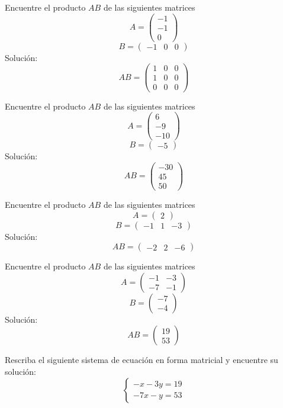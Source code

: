 \begin{exmp}
	Encuentre el producto $AB$ de las siguientes matrices
	$$A= \left(\begin{array}{r}
		-1 \\
		-1 \\
		0
	\end{array}\right) $$
	$$B= \left(\begin{array}{rrr}
		-1 & 0 & 0
	\end{array}\right) $$
	Solución:
	$$AB= \left(\begin{array}{rrr}
		1 & 0 & 0 \\
		1 & 0 & 0 \\
		0 & 0 & 0
	\end{array}\right) $$
\end{exmp}



\begin{exmp}
	Encuentre el producto $AB$ de las siguientes matrices
	$$A= \left(\begin{array}{r}
		6 \\
		-9 \\
		-10
	\end{array}\right) $$
	$$B= \left(\begin{array}{r}
		-5
	\end{array}\right) $$
	Solución:
	$$AB= \left(\begin{array}{r}
		-30 \\
		45 \\
		50
	\end{array}\right) $$
\end{exmp}



\begin{exmp}
	Encuentre el producto $AB$ de las siguientes matrices
	$$A= \left(\begin{array}{r}
		2
	\end{array}\right) $$
	$$B= \left(\begin{array}{rrr}
		-1 & 1 & -3
	\end{array}\right) $$
	Solución:
	$$AB= \left(\begin{array}{rrr}
		-2 & 2 & -6
	\end{array}\right) $$
\end{exmp}



\begin{exmp}
	Encuentre el producto $AB$ de las siguientes matrices
	$$A= \left(\begin{array}{rr}
		-1 & -3 \\
		-7 & -1
	\end{array}\right) $$
	$$B= \left(\begin{array}{r}
		-7 \\
		-4
	\end{array}\right) $$
	Solución:
	$$AB= \left(\begin{array}{r}
		19 \\
		53
	\end{array}\right) $$
\end{exmp}



\begin{exmp}
	Rescriba el siguiente sistema de ecuaci\'on en forma matricial y encuentre su soluci\'on:
	$$
	\begin{cases}
		-x-3y=19\\
		-7x-y=53
	\end{cases}
	$$
\end{exmp}


